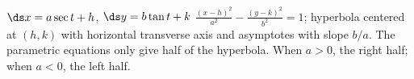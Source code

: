 {$\ds x=a\sec t+h$, \quad $\ds y=b\tan t+k$
}
{$\frac{(x-h)^2}{a^2}-\frac{(y-k)^2}{b^2}=1$; hyperbola centered at $(h,k)$ with horizontal transverse axis and asymptotes with slope $b/a$. The parametric equations only give half of the hyperbola. When $a>0$, the right half; when $a<0$, the left half.
}